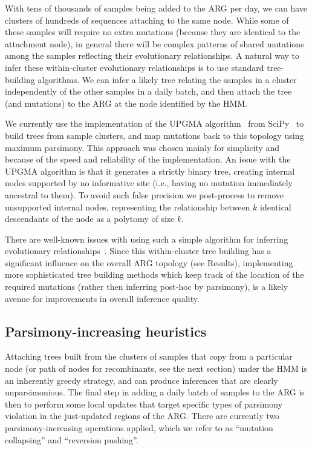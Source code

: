 \documentclass{article}
\begin{document}
With tens of thousands of samples being added to the ARG per day,
we can have clusters of hundreds of sequences attaching to the same node.
While some of these samples will require no extra mutations
(because they are identical to the attachment node), in general there
will be complex patterns of shared mutations among the samples
reflecting their evolutionary relationships. A natural way to infer
these within-cluster evolutionary relationships is to use standard
tree-building algorithms.
We can infer a likely tree relating the
samples in a cluster independently of the other samples in a
daily batch, and then attach the tree (and mutations)
to the ARG at the node identified by the HMM.

We currently use the implementation of the UPGMA algorithm~\citep{Michener1957-tr}
from SciPy~\citep{Pauli2020-scipy} to build trees from sample
clusters, and map mutations back to this topology using maximum parsimony.
This approach was chosen mainly for simplicity and because of the
speed and reliability of the implementation.
An issue with the UPGMA algorithm is that it generates a strictly
binary tree, creating internal nodes
supported by no informative site (i.e., having no mutation immediately
ancestral to them). To avoid such false precision we post-process
to remove unsupported internal nodes, representing the relationship
between $k$ identical descendants of the node as a polytomy of size $k$.

There are well-known issues with using such a simple algorithm for inferring
evolutionary relationships~\citep{Felsenstein2004-inferring}.
Since this within-cluster tree building has a significant influence on the
overall ARG topology (see Results), implementing more sophisticated
tree building methods which keep track of the location of the required mutations
(rather then inferring post-hoc by parsimony), is a likely avenue
for improvements in overall inference quality.

\subsection{Parsimony-increasing heuristics}
\label{sec:parsimony-heuristics}
Attaching trees built from the clusters of samples that copy from
a particular node (or path of nodes for recombinants, see the
next section) under the HMM is an inherently greedy strategy,
and can produce inferences that are clearly unparsimonious.
The final step in adding a daily batch of samples to the ARG
is then to perform some local updates that target specific
types of parsimony violation in the just-updated regions of the
ARG. There are currently two parsimony-increasing operations
applied, which we refer to as ``mutation collapsing'' and ``reversion
pushing''.
\end{document}
